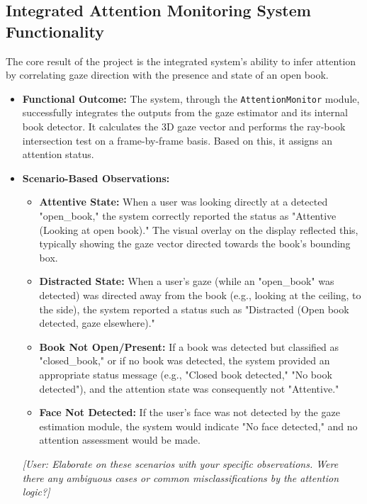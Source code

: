 \subsection{Integrated Attention Monitoring System Functionality}
The core result of the project is the integrated system's ability to infer attention by correlating gaze direction with the presence and state of an open book.
\begin{itemize}
    \item \textbf{Functional Outcome:} The system, through the \texttt{AttentionMonitor} module, successfully integrates the outputs from the gaze estimator and its internal book detector. It calculates the 3D gaze vector and performs the ray-book intersection test on a frame-by-frame basis. Based on this, it assigns an attention status.
    
    \item \textbf{Scenario-Based Observations:}
    \begin{itemize}
        \item \textbf{Attentive State:} When a user was looking directly at a detected "open\_book," the system correctly reported the status as "Attentive (Looking at open book)." The visual overlay on the display reflected this, typically showing the gaze vector directed towards the book's bounding box.
        \item \textbf{Distracted State:} When a user's gaze (while an "open\_book" was detected) was directed away from the book (e.g., looking at the ceiling, to the side), the system reported a status such as "Distracted (Open book detected, gaze elsewhere)."
        \item \textbf{Book Not Open/Present:} If a book was detected but classified as "closed\_book," or if no book was detected, the system provided an appropriate status message (e.g., "Closed book detected," "No book detected"), and the attention state was consequently not "Attentive."
        \item \textbf{Face Not Detected:} If the user's face was not detected by the gaze estimation module, the system would indicate "No face detected," and no attention assessment would be made.
    \end{itemize}
    \textit{[User: Elaborate on these scenarios with your specific observations. Were there any ambiguous cases or common misclassifications by the attention logic?]}


\end{itemize}
